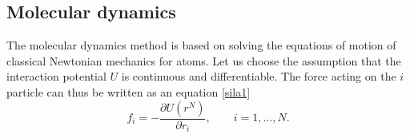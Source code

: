 %
%
%
%
%


\subsection{Molecular dynamics}
The molecular dynamics method is based on solving the equations of motion of classical Newtonian mechanics for atoms. Let us choose the assumption that the interaction potential $U$ is continuous and differentiable. The force acting on the $i$ particle can thus be written as an equation \ref{sila1} 
\begin{equation}\label{sila1}
	f_i=-\frac{\partial U(r^N)}{\partial r_i}, \qquad i=1,...,N.
\end{equation}

